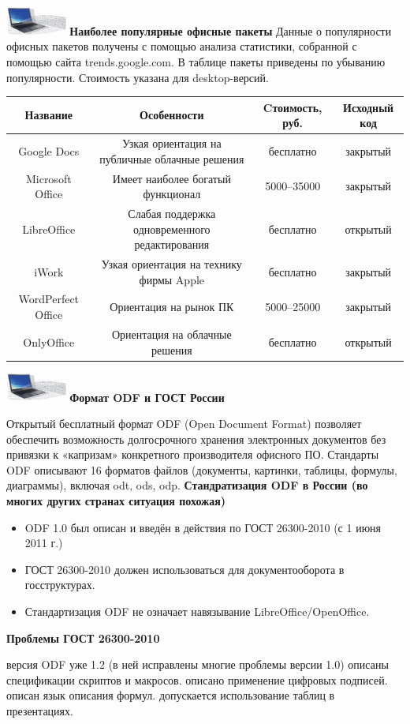 \documentclass[aspectratio=169]{beamer}
\begin{document}
\begin{frame}
\Large
\includegraphics[width=2cm]{logo} {\bf Наиболее популярные офисные пакеты}
\normalsize
Данные о популярности офисных пакетов получены с помощью анализа статистики,
собранной с помощью сайта trends.google.com. В таблице пакеты приведены по
убыванию популярности. Стоимость указана для desktop-версий.
\begin{center}
\scriptsize
\begin{tabular}{| c | c | c | c |}
\hline
Название & Особенности & Cтоимость, руб. & Исходный код\\ \hline
Google Docs & Узкая ориентация на публичные облачные решения & бесплатно & закрытый\\ \hline
Microsoft Office & Имеет наиболее богатый функционал & 5000–35000 & закрытый\\ \hline
LibreOffice & Слабая поддержка одновременного редактирования & бесплатно & открытый\\ \hline
iWork & Узкая ориентация на технику фирмы Apple & бесплатно & закрытый\\ \hline
WordPerfect Office & Ориентация на рынок ПК & 5000–25000 & закрытый\\ \hline
OnlyOffice & Ориентация на облачные решения & бесплатно & открытый\\ \hline
\end{tabular}
\end{center}
\end{frame}
\begin{frame}
\Large
\includegraphics[width=2cm]{logo} {\bf Формат ODF и ГОСТ России}
\footnotesize

Открытый бесплатный формат ODF (Open Document Format) позволяет обеспечить
возможность долгосрочного хранения электронных документов без привязки к «капризам»
конкретного производителя офисного ПО. Стандарты ODF описывают 16 форматов файлов
(документы, картинки, таблицы, формулы, диаграммы), включая odt, ods, odp.
{\bf Стандратизация ODF в России (во многих других странах ситуация похожая)}
\begin{itemize}
\item ODF 1.0 был описан и введён в действия по ГОСТ 26300-2010 (с 1 июня 2011 г.)
\item ГОСТ 26300-2010 должен использоваться для документооборота в госструктурах.
\item Стандартизация ODF не означает навязывание LibreOffice/OpenOffice.
\end{itemize}
{\bf Проблемы ГОСТ 26300-2010}
\begin{itemize}
 версия ODF уже 1.2 (в ней исправлены многие проблемы версии 1.0)
 описаны спецификации скриптов и макросов.
 описано применение цифровых подписей.
 описан язык описания формул.
 допускается использование таблиц в презентациях.
\end{itemize}
\end{frame}
\end{document}
